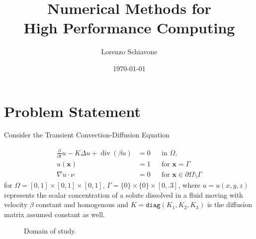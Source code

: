 \documentclass[hidelinks]{article}
\title{Numerical Methods for \\ High Performance Computing}
\author{Lorenzo Schiavone}
\date{\today}
\DeclareMathOperator{\divg}{div}
\begin{document}
\maketitle
\tableofcontents

\pagebreak

\section{Problem Statement}
Consider the Transient Convection-Diffusion Equation 

\begin{equation}\tag{$D$}\label{eq:strong}
    \begin{aligned}
    \frac{\partial}{\partial t}u -K \Delta u + \divg(\beta u) &=0 && \text{in } \Omega, \\
    u(\mathbf{x}) &= 1 && \text{for } \mathbf{x} = \Gamma  \\
    \nabla u \cdot \nu &= 0 && \text{for } \mathbf{x}\in \partial\Omega \setminus \Gamma 
\end{aligned}
\end{equation}
for $\Omega = [0,1] \times [0,1]\times [0,1]$, $\Gamma = \{0\} \times \{0\} \times [0, .3]$, where $u=u(x,y,z)$ represents the scalar concentration of a solute dissolved in a fluid moving with velocity $\beta$ constant and homogenous and $K=\texttt{diag}(K_1,K_2,K_3)$ is the diffusion matrix assumed constant as well.

\begin{figure}[H]
\begin{center}
\end{center}
\caption{Domain of study.}
\end{figure}
\end{document}
